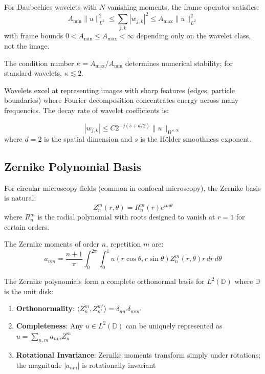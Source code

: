 \documentclass[twocolumn,11pt]{article}
\begin{document}
\begin{theorem}
For Daubechies wavelets with $N$ vanishing moments, the frame operator satisfies:
\begin{equation}
A_{\min} \|u\|_{L^2}^2 \leq \sum_{j,k} |w_{j,k}|^2 \leq A_{\max} \|u\|_{L^2}^2
\end{equation}
with frame bounds $0 < A_{\min} \leq A_{\max} < \infty$ depending only on the wavelet class, not the image.

The condition number $\kappa = A_{\max}/A_{\min}$ determines numerical stability; for standard wavelets, $\kappa \lesssim 2$.
\end{theorem}

Wavelets excel at representing images with sharp features (edges, particle boundaries) where Fourier decomposition concentrates energy across many frequencies. The decay rate of wavelet coefficients is:

\begin{equation}
|w_{j,k}| \leq C 2^{-j(s+d/2)} \|u\|_{W^{s,\infty}}
\end{equation}
where $d = 2$ is the spatial dimension and $s$ is the Hölder smoothness exponent.

\subsection{Zernike Polynomial Basis}

For circular microscopy fields (common in confocal microscopy), the Zernike basis is natural:
\begin{equation}
Z_n^m(r, \theta) = R_n^m(r) e^{im\theta}
\end{equation}
where $R_n^m$ is the radial polynomial with roots designed to vanish at $r=1$ for certain orders.

\begin{definition}
The Zernike moments of order $n$, repetition $m$ are:
\begin{equation}
a_{nm} = \frac{n+1}{\pi} \int_0^{2\pi} \int_0^1 u(r\cos\theta, r\sin\theta) \overline{Z_n^m(r,\theta)} r \, dr \, d\theta
\end{equation}
\end{definition}

\begin{theorem}
The Zernike polynomials form a complete orthonormal basis for $L^2(\mathbb{D})$ where $\mathbb{D}$ is the unit disk:
\begin{enumerate}
\item \textbf{Orthonormality}: $\langle Z_n^m, Z_{n'}^{m'} \rangle = \delta_{nn'} \delta_{mm'}$
\item \textbf{Completeness}: Any $u \in L^2(\mathbb{D})$ can be uniquely represented as $u = \sum_{n,m} a_{nm} Z_n^m$
\item \textbf{Rotational Invariance}: Zernike moments transform simply under rotations; the magnitude $|a_{nm}|$ is rotationally invariant
\end{enumerate}
\end{theorem}
\end{document}
